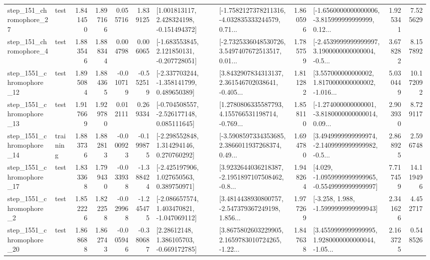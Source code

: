 \begin{tabular}{llrrrrllrlrr}
  step\_151\_chromophore\_27 &      test &      1.841450 &    1.897166 &      0.055716 &  1.839125 &    [1.001813117, 2.428324198, -0.151494372] &  [-1.7582127378211316, -4.032835333244579, 0.71... &       1.860596 &  [-1.6560000000000006, -3.815999999999999, 0.12... &            1.925341 &          7.525629 \\
   step\_151\_chromophore\_4 &      test &      1.883546 &    1.888344 &      0.004798 &  0.006065 &   [-1.683553845, 2.121850131, -0.207728051] &  [-2.7325336048530726, 3.5497407672513517, 0.01... &       1.785759 &  [-2.4539999999999997, 3.1900000000000004, -0.5... &            3.678282 &          8.157892 \\
 step\_1551\_chromophore\_12 &      test &      1.895084 &    1.884365 &     -0.010719 & -0.552519 &   [-2.337703244, -1.358141799, 0.489650389] &  [3.8432907834313137, 2.361546702038641, -0.405... &       1.811282 &  [3.557000000000002, 1.8170000000000002, -1.016... &            5.030449 &         10.172092 \\
 step\_1551\_chromophore\_13 &      test &      1.917669 &    1.929780 &      0.012111 &  0.269334 &   [-0.704508557, -2.526177148, 0.085111645] &  [1.2780806335587793, 4.155766531198714, -0.769... &       1.858110 &  [-1.274000000000001, -3.8180000000000014, 0.09... &            2.903930 &          8.729117 \\
 step\_1551\_chromophore\_14 &  training &      1.883736 &    1.882813 &     -0.000923 & -0.199875 &    [-2.298552848, 1.314294146, 0.270760292] &  [-3.5908597334353685, 2.3866011937268374, 0.49... &       1.694780 &  [3.4949999999999974, -2.1409999999999982, -0.5... &            2.868925 &          2.596748 \\
 step\_1551\_chromophore\_17 &      test &      1.833368 &    1.799430 &     -0.033938 & -1.388424 &    [-2.425197906, 1.027650563, 0.389750971] &  [3.9232644036218387, -2.1951897107508462, -0.8... &       1.948264 &  [4.029, -1.0959999999999965, -0.5549999999999997] &            7.717459 &         14.119496 \\
  step\_1551\_chromophore\_2 &      test &      1.852226 &    1.822258 &     -0.029968 & -1.245475 &   [-2.086657574, 1.403470821, -1.047069112] &  [3.4814438930800757, -2.547379367249198, 1.856... &       1.977269 &               [-3.258, 1.988, -1.5999999999999943] &            2.341626 &          4.452717 \\
 step\_1551\_chromophore\_20 &      test &      1.868688 &    1.862743 &     -0.005946 & -0.380687 &     [2.28612148, 1.386105703, -0.669172785] &  [3.8675802603229905, 2.1659783010724265, -1.22... &       1.847638 &  [3.4559999999999995, 1.9280000000000044, -1.05... &            2.163725 &          0.548526 \\

\end{tabular}
